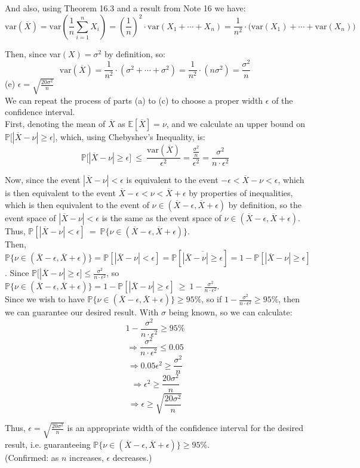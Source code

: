 \documentclass{article}
\begin{document}
And also, using Theorem 16.3 and a result from Note 16 we have:
$$\text{var}(\overline{X}) =
\text{var}(\frac{1}{n} \sum\limits_{i=1}^n X_i) =
(\frac{1}{n})^2\cdot\text{var}(X_1 + \cdots + X_n) =
\frac{1}{n^2}\cdot\big(\text{var}(X_1) + \cdots + \text{var}(X_n)\big)$$

Then, since var$(X) = \sigma^2$ by definition, so:
$$
\text{var}(\overline{X}) =
\frac{1}{n^2}\cdot(\sigma^2 + \cdots + \sigma^2) =
\frac{1}{n^2}\cdot(n\sigma^2) = \frac{\sigma^2}{n}
$$
{\color{red} (e) $\epsilon = \sqrt{\frac{20\sigma^2}{n}}$ } \\

We can repeat the process of parts (a) to (c) to choose a proper width $\epsilon$ of the confidence interval. \\

First, denoting the mean of $\overline{X}$ as $\mathbb{E}[\overline{X}] = \nu$, and we calculate an upper bound on
$\mathbb{P}\big[|\overline{X}-\nu|\geq\epsilon\big]$, which, using Chebyshev's Inequality, is:
$$\mathbb{P}\big[|\overline{X}-\nu|\geq\epsilon\big]\ \leq\
\frac{\text{var}(\overline{X})}{\epsilon^2} =
\frac{\frac{\sigma^2}{n}}{\epsilon^2} = \frac{\sigma^2}{n\cdot\epsilon^2}$$

Now, since the event $|\overline{X}-\nu|<\epsilon$ is equivalent to the event $-\epsilon < \overline{X}-\nu < \epsilon$,
which is then equivalent to the event $\overline{X}-\epsilon < \nu < \overline{X}+\epsilon$ by properties of inequalities,
which is then equivalent to the event of $\nu\in(\overline{X}-\epsilon, \overline{X}+\epsilon)$ by definition,
so the event space of
$|\overline{X}-\nu|<\epsilon$ is the same as the event space of
$\nu\in(\overline{X}-\epsilon, \overline{X}+\epsilon)$.
Thus, $\mathbb{P}[|\overline{X}-\nu|<\epsilon]\ =\
\mathbb{P}\big\{\nu\in(\overline{X}-\epsilon, \overline{X}+\epsilon)\big\}$. \\

Then, $\mathbb{P}\big\{\nu\in(\overline{X}-\epsilon, \overline{X}+\epsilon)\big\} =
\mathbb{P}[|\overline{X}-\nu|<\epsilon] =
\mathbb{P}[\overline{|\overline{X}-\nu|\geq\epsilon}] =
1 - \mathbb{P}[|\overline{X}-\nu|\geq\epsilon]$.
Since $\mathbb{P}\big[|\overline{X}-\nu|\geq\epsilon\big] \leq
\frac{\sigma^2}{n\cdot\epsilon^2}$, so
$\mathbb{P}\big\{\nu\in(\overline{X}-\epsilon, \overline{X}+\epsilon)\big\} =
1 - \mathbb{P}[|\overline{X}-\nu|\geq\epsilon]\ \geq\
1 - \frac{\sigma^2}{n\cdot\epsilon^2}$. \\

Since we wish to have
$\mathbb{P}\big\{\nu\in(\overline{X}-\epsilon, \overline{X}+\epsilon)\big\} \geq95\%$,
so if $1 - \frac{\sigma^2}{n\cdot\epsilon^2} \geq 95\%$, then we can guarantee our desired result. With $\sigma$ being known, so we can calculate:
$$1 - \frac{\sigma^2}{n\cdot\epsilon^2} \geq 95\%$$
$$\Longrightarrow \frac{\sigma^2}{n\cdot\epsilon^2}\leq 0.05$$
$$\Longrightarrow 0.05\epsilon^2 \geq \frac{\sigma^2}{n}$$
$$\Longrightarrow \epsilon^2 \geq \frac{20\sigma^2}{n}$$
$$\Longrightarrow \epsilon \geq \sqrt{\frac{20\sigma^2}{n}}$$

Thus, $\epsilon = \sqrt{\frac{20\sigma^2}{n}}$ is an appropriate width of the confidence interval for the desired result, i.e. guaranteeing $\mathbb{P}\big\{\nu\in(\overline{X}-\epsilon, \overline{X}+\epsilon)\big\} \geq 95\%$. \\

(Confirmed: as $n$ increases, $\epsilon$ decreases.)
\end{document}
